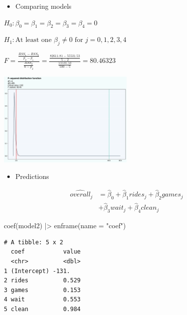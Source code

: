 \documentclass[
  ignorenonframetext,
]{beamer}
\newenvironment{Shaded}{\begin{snugshade}}{\end{snugshade}}
\newcommand{\AttributeTok}[1]{\textcolor[rgb]{0.40,0.45,0.13}{#1}}
\newcommand{\FunctionTok}[1]{\textcolor[rgb]{0.28,0.35,0.67}{#1}}
\newcommand{\NormalTok}[1]{\textcolor[rgb]{0.00,0.23,0.31}{#1}}
\newcommand{\SpecialCharTok}[1]{\textcolor[rgb]{0.37,0.37,0.37}{#1}}
\newcommand{\StringTok}[1]{\textcolor[rgb]{0.13,0.47,0.30}{#1}}
\providecommand{\tightlist}{%
  \setlength{\itemsep}{0pt}\setlength{\parskip}{0pt}}\usepackage{longtable,booktabs,array}
\begin{document}
\begin{frame}{}
\label{section-30}
\begin{itemize}
\tightlist
\item
  Comparing models
\end{itemize}

\tiny

\(H_0: \beta_0 = \beta_1 = \beta_2 = \beta_3 = \beta_4 = 0\)

\(H_1: \text{At least one } \beta_j \neq 0 \text{ for } j = 0, 1, 2, 3, 4\)

\(F = \frac{\frac{RSS_1 - RSS_2}{p_2 - p_1}}{\frac{RSS_2}{n - p_2}} = \frac{\frac{82611.81 - 55531.53}{5 - 2}}{\frac{55531.53}{500 - 5}} = 80.46323\)

\begin{center}
\includegraphics[width=0.5\textwidth,height=\textheight]{007_identifying_drivers_of_outcomes_linear_models_files/figure-beamer/unnamed-chunk-28-1.pdf}
\end{center}
\end{frame}

\begin{frame}[fragile]{}
\label{section-31}
\begin{itemize}
\tightlist
\item
  Predictions
\end{itemize}

\[\begin{split}
   \widehat{overall}_{j} & = \widehat{\beta}_0 + \widehat{\beta}_1 rides_j + \widehat{\beta}_2 games_j \\
   & + \widehat{\beta}_3 wait_j + \widehat{\beta}_4 clean_j
   \end{split}\]

\tiny

\begin{Shaded}
\begin{Highlighting}[]
\FunctionTok{coef}\NormalTok{(model2) }\SpecialCharTok{|\textgreater{}} \FunctionTok{enframe}\NormalTok{(}\AttributeTok{name =} \StringTok{"coef"}\NormalTok{)}
\end{Highlighting}
\end{Shaded}

\begin{verbatim}
# A tibble: 5 x 2
  coef           value
  <chr>          <dbl>
1 (Intercept) -131.   
2 rides          0.529
3 games          0.153
4 wait           0.553
5 clean          0.984
\end{verbatim}
\end{frame}
\end{document}
